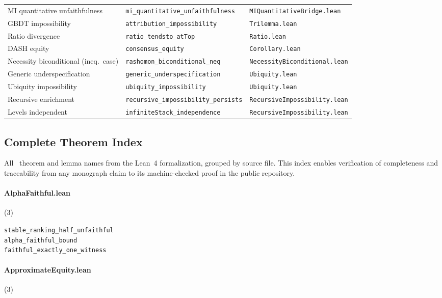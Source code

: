 {\begin{longtable}{@{}p{4.5cm}p{5.2cm}p{5.2cm}@{}}
MI quantitative unfaithfulness & \texttt{mi\_quantitative\_unfaithfulness} & \texttt{MIQuantitativeBridge.lean} \\
GBDT impossibility & \texttt{attribution\_impossibility} & \texttt{Trilemma.lean} \\
Ratio divergence & \texttt{ratio\_tendsto\_atTop} & \texttt{Ratio.lean} \\
DASH equity & \texttt{consensus\_equity} & \texttt{Corollary.lean} \\
Necessity biconditional (ineq.\ case) & \texttt{rashomon\_biconditional\_neq} & \texttt{NecessityBiconditional.lean} \\
Generic underspecification & \texttt{generic\_underspecification} & \texttt{Ubiquity.lean} \\
Ubiquity impossibility & \texttt{ubiquity\_impossibility} & \texttt{Ubiquity.lean} \\
Recursive enrichment & \texttt{recursive\_impossibility\_persists} & \texttt{RecursiveImpossibility.lean} \\
Levels independent & \texttt{infiniteStack\_independence} & \texttt{RecursiveImpossibility.lean} \\
\bottomrule
\end{longtable}
}

\subsection{Complete Theorem Index}
\label{sec:type-sigs}

\noindent All \ClaimMainTheorems~theorem and lemma names from the Lean~4
formalization, grouped by source file. This index enables
verification of completeness and traceability from any monograph
claim to its machine-checked proof in the public repository.

\paragraph{AlphaFaithful.lean} (3)

{\footnotesize
\texttt{stable\_ranking\_half\_unfaithful}\\
\texttt{alpha\_faithful\_bound}\\
\texttt{faithful\_exactly\_one\_witness}\\
}

\paragraph{ApproximateEquity.lean} (3)

